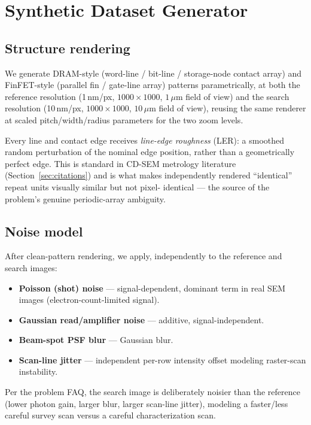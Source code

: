\documentclass[11pt]{article}
\begin{document}
\section{Synthetic Dataset Generator}

\subsection{Structure rendering}

We generate DRAM-style (word-line / bit-line / storage-node contact array)
and FinFET-style (parallel fin / gate-line array) patterns parametrically,
at both the reference resolution (1\,nm/px, $1000\times1000$, $1\,\mu
\text{m}$ field of view) and the search resolution (10\,nm/px,
$1000\times1000$, $10\,\mu\text{m}$ field of view), reusing the same
renderer at scaled pitch/width/radius parameters for the two zoom levels.

Every line and contact edge receives \emph{line-edge roughness} (LER): a
smoothed random perturbation of the nominal edge position, rather than a
geometrically perfect edge. This is standard in CD-SEM metrology
literature (Section~\ref{sec:citations}) and is what makes independently
rendered ``identical'' repeat units visually similar but not pixel-
identical --- the source of the problem's genuine periodic-array ambiguity.

\subsection{Noise model}

After clean-pattern rendering, we apply, independently to the reference
and search images:
\begin{itemize}
  \item \textbf{Poisson (shot) noise} --- signal-dependent, dominant term
    in real SEM images (electron-count-limited signal).
  \item \textbf{Gaussian read/amplifier noise} --- additive,
    signal-independent.
  \item \textbf{Beam-spot PSF blur} --- Gaussian blur.
  \item \textbf{Scan-line jitter} --- independent per-row intensity offset
    modeling raster-scan instability.
\end{itemize}
Per the problem FAQ, the search image is deliberately noisier than the
reference (lower photon gain, larger blur, larger scan-line jitter),
modeling a faster/less careful survey scan versus a careful
characterization scan.
\end{document}
